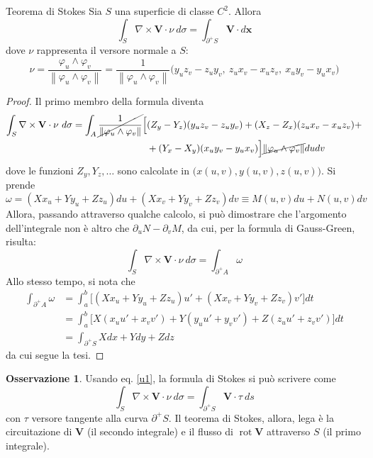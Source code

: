 \documentclass[11pt, a4paper]{scrartcl}
\theoremstyle{definition}
\numberwithin{esempio}{section}
\theoremstyle{definition}
\newtheorem{obs}{Osservazione}
\numberwithin{obs}{section}
\numberwithin{nota}{section}
\numberwithin{equation}{subsection}
\begin{document}
\begin{teorema}
	{Teorema di Stokes}{}
	Sia $S$ una superficie di classe $C^2$. Allora
	\begin{equation}
		\int_{S} \nabla \times \mathbf{V} \cdot \nu \ d\sigma = \int_{\partial ^+ S} \mathbf{V} \cdot d\mathbf{x} 
	\end{equation}
	dove $\nu $ rappresenta il versore normale a $S$:
	\[
	\nu = \frac{\varphi _u \wedge \varphi _v}{\left\lVert \varphi _u \wedge \varphi _v \right\rVert } = \frac{1}{\left\lVert \varphi _u \wedge \varphi _v \right\rVert } \big( y_uz_v - z_uy_v , \ z_ux_v - x_u z_v, \ x_uy_v - y_ux_v\big)
	\] 
\begin{proof}
Il primo membro della formula diventa	
\[
	\begin{split}
		\int_{S}  \nabla \times  \mathbf{V} \cdot \nu  \ d\sigma  = \int_{A} \cancel{\frac{1}{\left\lVert \varphi _u\wedge \varphi _v \right\rVert }}\Big[&(Z_y - Y_z) (y_uz_v-z_uy_v)+(X_z-Z_x)(z_ux_v-x_uz_v) + \\
																				  &+ (Y_x - X_y)(x_uy_v-y_ux_v)\Big]\cancel{\left\lVert \varphi _u\wedge \varphi _v \right\rVert}dudv
	\end{split}
\] 
dove le funzioni $Z_y , Y_z, \ldots$ sono calcolate in $\big(x(u,v), y(u,v), z(u,v)\big)$.
Si prende
\[
\omega = (Xx_u  + Yy_u  + Zz_u) du + (Xx_v + Yy_v  + Zz_v) dv \equiv M(u,v) du + N(u,v) dv
\] 
Allora, passando attraverso qualche calcolo, si pu\`o dimostrare che l'argomento dell'integrale non \`e altro che $\partial _u N - \partial _v M$, da cui, per la formula di Gauss-Green, risulta:
\[
	\int_{S}  \nabla \times \mathbf{V} \cdot \nu  \ d\sigma = \int_{\partial ^+ A}  \omega 
\] 
Allo stesso tempo, si nota che 
\[
\begin{split}
	\int_{\partial ^+ A}  \omega &=  \int_{a} ^b \Big[(Xx_u+Yy_u+Zz_u)u' + (Xx_v + Yy_v + Zz_v) v'\Big]dt\\
				     &=\int_{a} ^b \Big[X(x_u u' + x_vv') + Y (y_uu' + y_v v') + Z (z_uu'+z_v v')\Big] dt \\
				     &= \int_{\partial ^+ S} Xdx + Y dy + Zdz 
\end{split}
\] 
da cui segue la tesi.
\end{proof}	
\end{teorema}
\begin{obs}
Usando eq. \ref{u1}, la formula di Stokes si pu\`o scrivere come
\begin{equation}
	\int_{S}  \nabla \times \mathbf{V}  \cdot \nu  \ d\sigma = \int_{\partial ^+ S} \mathbf{V} \cdot \tau \ ds
\end{equation}
con $\tau $ versore tangente alla curva $\partial ^+ S$.
Il teorema di Stokes, allora, lega \`e la circuitazione di $\mathbf{V} $ (il secondo integrale) e il flusso di $\operatorname{rot} \mathbf{V}  $ attraverso $S$ (il primo integrale).
\end{obs}
\end{document}
